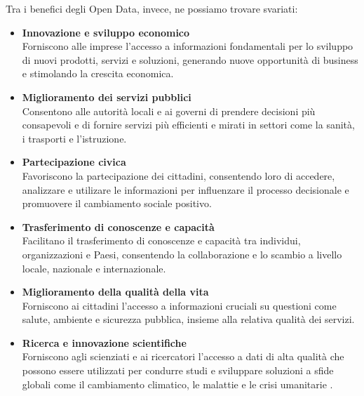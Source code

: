Tra i benefici degli Open Data, invece, ne possiamo trovare svariati:
\begin{itemize}
    \item \textbf{Innovazione e sviluppo economico}\\
    Forniscono alle imprese l'accesso a informazioni fondamentali per lo sviluppo di nuovi prodotti, servizi e soluzioni, generando nuove opportunità di business e stimolando la crescita economica.
    \item \textbf{Miglioramento dei servizi pubblici}\\
    Consentono alle autorità locali e ai governi di prendere decisioni più consapevoli e di fornire servizi più efficienti e mirati in settori come la sanità, i trasporti e l'istruzione.
    \item \textbf{Partecipazione civica}\\
    Favoriscono la partecipazione dei cittadini, consentendo loro di accedere, analizzare e utilizare le informazioni per influenzare il processo decisionale e promuovere il cambiamento sociale positivo.
    \item \textbf{Trasferimento di conoscenze e capacità}\\
    Facilitano il trasferimento di conoscenze e capacità tra individui, organizzazioni e Paesi, consentendo la collaborazione e lo scambio a livello locale, nazionale e internazionale.
    \item \textbf{Miglioramento della qualità della vita}\\
    Forniscono ai cittadini l'accesso a informazioni cruciali su questioni come salute, ambiente e sicurezza pubblica, insieme alla relativa qualità dei servizi.
    \item \textbf{Ricerca e innovazione scientifiche}\\
    Forniscono agli scienziati e ai ricercatori l'accesso a dati di alta qualità che possono essere utilizzati per condurre studi e sviluppare soluzioni a sfide globali come il cambiamento climatico, le malattie e le crisi umanitarie \cite{Open_Data_Opportunità}.
\end{itemize}



